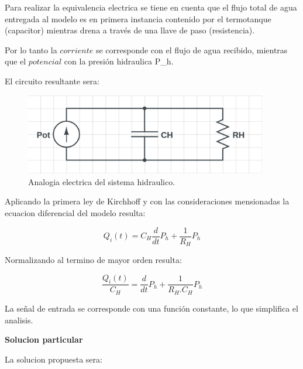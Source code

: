 \documentclass[a4paper,12pt]{article}
\begin{document}
Para realizar la equivalencia electrica se tiene en cuenta que el flujo total de agua entregada al modelo es en primera instancia contenido por el termotanque (capacitor) mientras drena a través de una llave de paso (resistencia).\par
Por lo tanto la $corriente$ se corresponde con el flujo de agua recibido, mientras que el $potencial$ con la presión hidraulica P_{h}.\par
\vspace*{0.2in}
El circuito resultante sera:\par

\begin{figure}[H]
\begin{center}
\includegraphics[width = 300pt]{imagenes/RC_hidraulico.png}
\caption{\small Analogia electrica del sistema hidraulico. }
\end{center}
\end{figure}

Aplicando la primera ley de Kirchhoff y con las consideraciones mensionadas la ecuacion diferencial del modelo resulta:\par

\begin{equation}
Q_{i}(t)= C_{H}\frac{d}{dt}P_{h}+\frac{1}{R_{H}}P_{h}
\end{equation}\par

Normalizando al termino de mayor orden resulta:\par

\begin{equation}
\frac{Q_{i}(t)}{C_{H}}=\frac{d}{dt}
P_{h}+\frac{1}{R_{H}.C_{H}}P_{h}
\end{equation}

\vspace*{0.2in}
La señal de entrada se corresponde con una función constante, lo que simplifica el analisis.\par
\vspace*{0.2in}

\textbf{Solucion particular}\par
\vspace*{0.1in}
La solucion propuesta sera:\par
\end{document}
